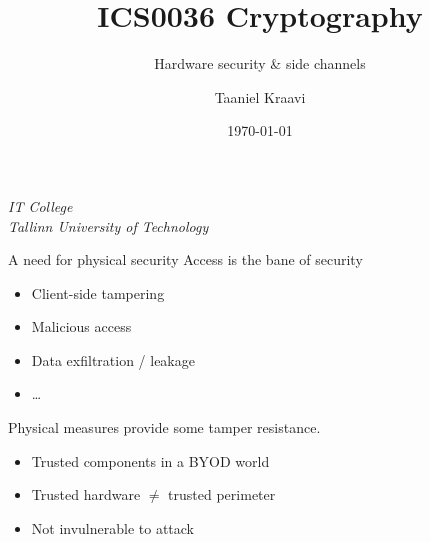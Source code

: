 \usepackage{listings}

\title{ICS0036 Cryptography}
\subtitle{Hardware security \& side channels}
\date{\today}
\author{Taaniel Kraavi}
\institute%
{%
  \textit{IT College}\\
  \textit{Tallinn University of Technology}
}


\begin{frame}
  \titlepage
\end{frame}

\begin{frame}{A need for physical security}
  Access is the bane of security
  \begin{itemize}[<+(1)->]
    \item Client-side tampering
    \item Malicious access
    \item Data exfiltration / leakage
    \item \dots
  \end{itemize}

  \vspace*{1em}

  \pause
  Physical measures provide some tamper resistance.
  \begin{itemize}[<+(1)->]
    \item Trusted components in a BYOD world
    \item Trusted hardware $\neq$ trusted perimeter
    \item Not invulnerable to attack
  \end{itemize}
\end{frame}

